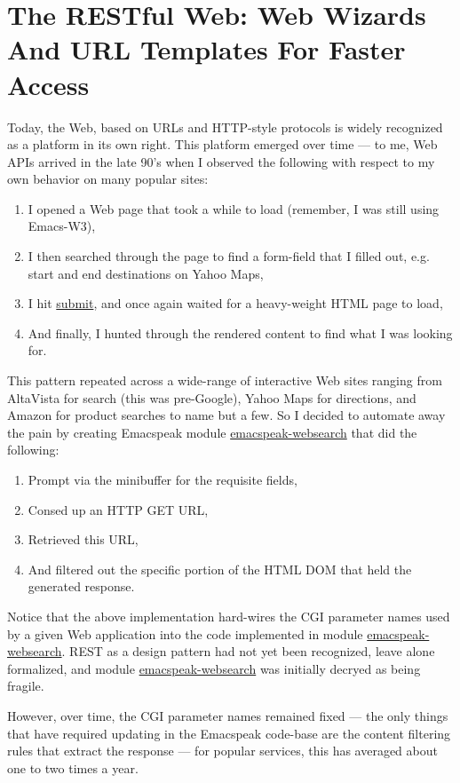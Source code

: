 \documentclass[11pt]{article}
\begin{document}
\section{The RESTful Web:  Web Wizards And URL Templates For Faster Access}
\label{sec-14}

Today, the Web, based on URLs and HTTP-style protocols is widely
recognized as a platform in its own right. This platform emerged
over time — to me, Web APIs arrived in the late 90's when I
observed the following with respect  to my own behavior  on many
popular sites:

\begin{enumerate}
\item I opened a Web page that took a while to load (remember,  I
was still using Emacs-W3),
\item I then searched through the page to find a form-field that
I filled out, e.g. start and end destinations on Yahoo Maps,
\item I hit \uline{submit}, and once again waited for a heavy-weight
HTML page to load,
\item And finally, I hunted through the rendered content to find
what I was looking for.
\end{enumerate}

This pattern repeated across a wide-range of interactive Web
sites ranging from AltaVista for search (this was pre-Google), Yahoo Maps for directions, and Amazon for product searches
to name but a few. So I decided to automate away the pain by
creating Emacspeak module \uline{emacspeak-websearch}
that  did the following: 

\begin{enumerate}
\item Prompt via the minibuffer for the requisite fields,
\item Consed up an HTTP GET URL,
\item Retrieved this URL,
\item And filtered out the specific portion of the HTML  DOM that
held the  generated response.
\end{enumerate}

Notice that the above implementation hard-wires the CGI parameter
names used by a given Web application into the code implemented
in module \uline{emacspeak-websearch}.  REST as a design pattern had
not yet been recognized, leave alone formalized, and module
\uline{emacspeak-websearch} was initially decryed as being fragile.

However, over time, the CGI parameter names remained fixed — the
 only things that have required updating in the Emacspeak
 code-base are the content filtering rules that extract the
 response — for popular services, this has averaged about one to
 two times a year.
\end{document}
